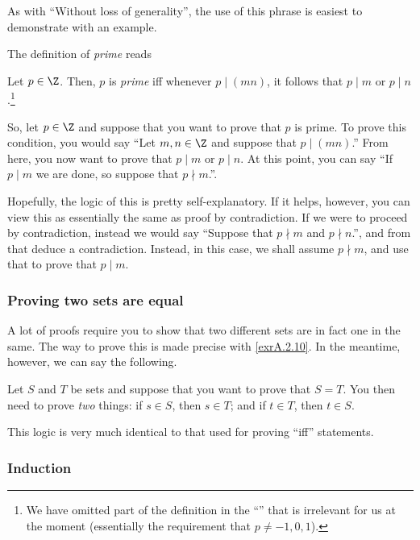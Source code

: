 As with ``Without loss of generality\textellipsis '', the use of this phrase is easiest to demonstrate with an example.

The definition of \emph{prime} reads
\begin{displayquote}
Let $p\in \Z$.  Then, $p$ is \emph{prime} iff \textellipsis whenever $p\mid (mn)$, it follows that $p\mid m$ or $p\mid n$.\footnote{We have omitted part of the definition in the ``\textellipsis'' that is irrelevant for us at the moment (essentially the requirement that $p\neq -1,0,1$).}
\end{displayquote}
So, let $p\in \Z$ and suppose that you want to prove that $p$ is prime.  To prove this condition, you would say ``Let $m,n\in \Z$ and suppose that $p\mid (mn)$.''  From here, you now want to prove that $p\mid m$ or $p\mid n$.  At this point, you can say ``If $p\mid m$ we are done, so suppose that $p\nmid m$.''.

Hopefully, the logic of this is pretty self-explanatory.  If it helps, however, you can view this as essentially the same as proof by contradiction.  If we were to proceed by contradiction, instead we would say ``Suppose that $p\nmid m$ and $p\nmid n$.'', and from that deduce a contradiction.  Instead, in this case, we shall assume $p\nmid m$, and use that to prove that $p\mid m$.

\subsubsection{Proving two sets are equal}

A lot of proofs require you to show that two different sets are in fact one in the same.  The way to prove this is made precise with \cref{exrA.2.10}.  In the meantime, however, we can say the following.
\begin{displayquote}
Let $S$ and $T$ be sets and suppose that you want to prove that $S=T$.  You then need to prove \emph{two} things:  if $s\in S$, then $s\in T$; and if $t\in T$, then $t\in S$.
\end{displayquote}
This logic is very much identical to that used for proving ``iff'' statements.

\subsubsection{Induction}

